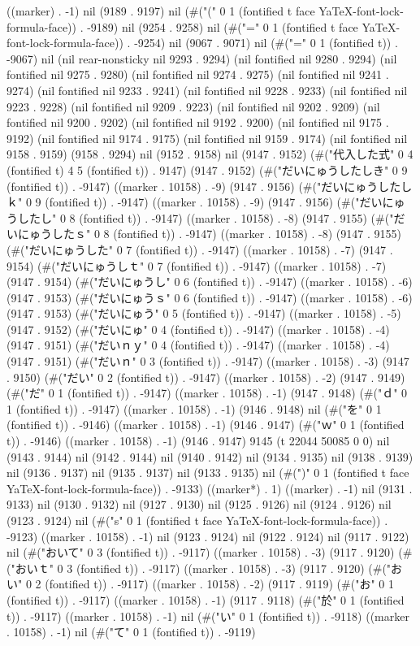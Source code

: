 {((marker) . -1) nil (9189 . 9197) nil (#("(" 0 1 (fontified t face YaTeX-font-lock-formula-face)) . -9189) nil (9254 . 9258) nil (#("=" 0 1 (fontified t face YaTeX-font-lock-formula-face)) . -9254) nil (9067 . 9071) nil (#("=" 0 1 (fontified t)) . -9067) nil (nil rear-nonsticky nil 9293 . 9294) (nil fontified nil 9280 . 9294) (nil fontified nil 9275 . 9280) (nil fontified nil 9274 . 9275) (nil fontified nil 9241 . 9274) (nil fontified nil 9233 . 9241) (nil fontified nil 9228 . 9233) (nil fontified nil 9223 . 9228) (nil fontified nil 9209 . 9223) (nil fontified nil 9202 . 9209) (nil fontified nil 9200 . 9202) (nil fontified nil 9192 . 9200) (nil fontified nil 9175 . 9192) (nil fontified nil 9174 . 9175) (nil fontified nil 9159 . 9174) (nil fontified nil 9158 . 9159) (9158 . 9294) nil (9152 . 9158) nil (9147 . 9152) (#("代入した式" 0 4 (fontified t) 4 5 (fontified t)) . 9147) (9147 . 9152) (#("だいにゅうしたしき" 0 9 (fontified t)) . -9147) ((marker . 10158) . -9) (9147 . 9156) (#("だいにゅうしたしｋ" 0 9 (fontified t)) . -9147) ((marker . 10158) . -9) (9147 . 9156) (#("だいにゅうしたし" 0 8 (fontified t)) . -9147) ((marker . 10158) . -8) (9147 . 9155) (#("だいにゅうしたｓ" 0 8 (fontified t)) . -9147) ((marker . 10158) . -8) (9147 . 9155) (#("だいにゅうした" 0 7 (fontified t)) . -9147) ((marker . 10158) . -7) (9147 . 9154) (#("だいにゅうしｔ" 0 7 (fontified t)) . -9147) ((marker . 10158) . -7) (9147 . 9154) (#("だいにゅうし" 0 6 (fontified t)) . -9147) ((marker . 10158) . -6) (9147 . 9153) (#("だいにゅうｓ" 0 6 (fontified t)) . -9147) ((marker . 10158) . -6) (9147 . 9153) (#("だいにゅう" 0 5 (fontified t)) . -9147) ((marker . 10158) . -5) (9147 . 9152) (#("だいにゅ" 0 4 (fontified t)) . -9147) ((marker . 10158) . -4) (9147 . 9151) (#("だいｎｙ" 0 4 (fontified t)) . -9147) ((marker . 10158) . -4) (9147 . 9151) (#("だいｎ" 0 3 (fontified t)) . -9147) ((marker . 10158) . -3) (9147 . 9150) (#("だい" 0 2 (fontified t)) . -9147) ((marker . 10158) . -2) (9147 . 9149) (#("だ" 0 1 (fontified t)) . -9147) ((marker . 10158) . -1) (9147 . 9148) (#("ｄ" 0 1 (fontified t)) . -9147) ((marker . 10158) . -1) (9146 . 9148) nil (#("を" 0 1 (fontified t)) . -9146) ((marker . 10158) . -1) (9146 . 9147) (#("ｗ" 0 1 (fontified t)) . -9146) ((marker . 10158) . -1) (9146 . 9147) 9145 (t 22044 50085 0 0) nil (9143 . 9144) nil (9142 . 9144) nil (9140 . 9142) nil (9134 . 9135) nil (9138 . 9139) nil (9136 . 9137) nil (9135 . 9137) nil (9133 . 9135) nil (#(")" 0 1 (fontified t face YaTeX-font-lock-formula-face)) . -9133) ((marker*) . 1) ((marker) . -1) nil (9131 . 9133) nil (9130 . 9132) nil (9127 . 9130) nil (9125 . 9126) nil (9124 . 9126) nil (9123 . 9124) nil (#("s" 0 1 (fontified t face YaTeX-font-lock-formula-face)) . -9123) ((marker . 10158) . -1) nil (9123 . 9124) nil (9122 . 9124) nil (9117 . 9122) nil (#("おいて" 0 3 (fontified t)) . -9117) ((marker . 10158) . -3) (9117 . 9120) (#("おいｔ" 0 3 (fontified t)) . -9117) ((marker . 10158) . -3) (9117 . 9120) (#("おい" 0 2 (fontified t)) . -9117) ((marker . 10158) . -2) (9117 . 9119) (#("お" 0 1 (fontified t)) . -9117) ((marker . 10158) . -1) (9117 . 9118) (#("於" 0 1 (fontified t)) . -9117) ((marker . 10158) . -1) nil (#("い" 0 1 (fontified t)) . -9118) ((marker . 10158) . -1) nil (#("て" 0 1 (fontified t)) . -9119) }

